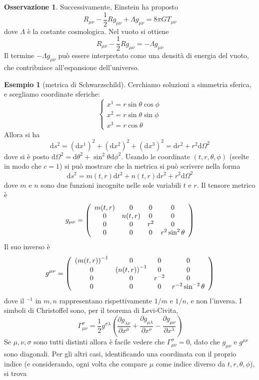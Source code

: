 \documentclass[a4paper,11pt]{article}
\theoremstyle{definition}
\newtheorem{osservazione}{Osservazione}[section]
\newtheorem{esempio}{Esempio}[section]
\theoremstyle{theorem}
\newcommand{\dif}{\mathrm{d}}
\begin{document}
\begin{osservazione}
	Successivamente, Einstein ha proposto
	\[R_{\mu\nu}-\frac{1}{2}Rg_{\mu\nu}+\Lambda g_{\mu\nu}=8\pi GT_{\mu\nu}\]
	dove $\Lambda$ è la costante cosmologica. Nel vuoto si ottiene
	\[R_{\mu\nu}-\frac{1}{2}Rg_{\mu\nu}=-\Lambda g_{\mu\nu}\]
	Il termine $-\Lambda g_{\mu\nu}$ può essere interpretato come una densità di energia del vuoto, che contribuisce all'espansione dell'universo.
\end{osservazione}
\begin{esempio}[metrica di Schwarzschild]
	Cerchiamo soluzioni a simmetria sferica, e scegliamo coordinate sferiche:
	\[\left\{\begin{array}{l}
	x^1=r\sin\theta\cos\phi\\x^2=r\sin\theta\sin\phi\\x^3=r\cos\theta
	\end{array}\right.\]
	Allora si ha
	\[\dif s^2=\left(\dif x^1\right)^2+\left(\dif x^2\right)^2+\left(\dif x^3\right)^2=\dif r^2+r^2\dif\Omega^2\]
	dove si è posto $\dif\Omega^2=\dif\theta^2+\sin^2\theta\dif\phi^2$. Usando le coordinate $(t,r,\theta,\phi)$ (scelte in modo che $c=1$) si può mostrare che la metrica si può scrivere nella forma
	\[\dif s^2=m(t,r)\dif t^2+n(t,r)\dif r^2+r^2\dif\Omega^2\]
	dove $m$ e $n$ sono due funzioni incognite nelle sole variabili $t$ e $r$. Il tensore metrico è
	\[g_{\mu\nu}=\left(\begin{array}{c c c c}
	m(t,r)&0&0&0\\0&n(t,r)&0&0\\0&0&r^2&0\\0&0&0&r^2\sin^2\theta
	\end{array}\right)\]
	Il suo inverso è
	\[g^{\mu\nu}=\left(\begin{array}{c c c c}
	\left(m(t,r)\right)^{-1}&0&0&0\\0&\left(n(t,r)\right)^{-1}&0&0\\0&0&r^{-2}&0\\0&0&0&r^{-2}\sin^{-2}\theta
	\end{array}\right)\]
	dove il $^{-1}$ in $m,n$ rappresentano rispettivamente $1/m$ e $1/n$, e non l'inversa.
	I simboli di Christoffel sono, per il teorema di Levi-Civita,
	\[\Gamma^{\sigma}_{\mu\nu}=\frac{1}{2}g^{\sigma\lambda}\left(\frac{\partial g_{\lambda\nu}}{\partial x^\mu}+\frac{\partial g_{\mu\lambda}}{\partial x^\nu}-\frac{\partial g_{\mu\nu}}{\partial x^\lambda}\right)\]
	Se $\mu,\nu,\sigma$ sono tutti distinti allora è facile vedere che $\Gamma^\sigma_{\mu\nu}=0$, dato che $g_{\mu\nu}$ e $g^{\mu\nu}$ sono diagonali. Per gli altri casi, identificando una coordinata con il proprio indice (e considerando, ogni volta che compare $\mu$ come indice diverso da $t,r,\theta,\phi$), si trova

\end{esempio}
\end{document}
